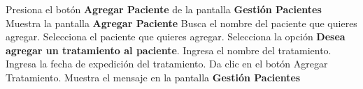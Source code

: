  \begin{UCtrayectoria}
 	
 	\UCpaso [\UCactor] Presiona el botón \textbf{Agregar Paciente} de la pantalla \textbf{Gestión Pacientes}
 	\UCpaso Muestra la pantalla \textbf{Agregar Paciente}
 	\UCpaso [\UCactor] Busca el nombre del paciente que quieres agregar.
 	\UCpaso [\UCactor] Selecciona el paciente que quieres agregar.
 	\UCpaso [\UCactor] Selecciona la opción \textbf{Desea agregar un tratamiento al paciente}.
 	\UCpaso [\UCactor] Ingresa el nombre del tratamiento.
 	\UCpaso [\UCactor] Ingresa la fecha de expedición del tratamiento.
 	\UCpaso [\UCactor] Da clic en el botón Agregar Tratamiento.
 	\UCpaso Muestra el mensaje  en la pantalla \textbf{Gestión Pacientes} 
 	
 \end{UCtrayectoria}


%

